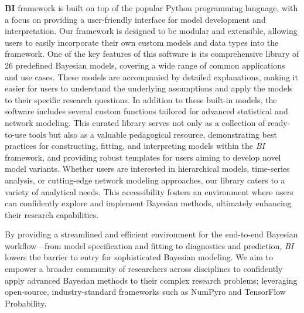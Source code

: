 \documentclass[blind,lineno,num-refs]{wiley-article}
\begin{document}
\textbf{BI} framework is built on top of the popular Python programming language, with a focus on providing a user-friendly interface for model development and interpretation. Our framework is designed to be modular and extensible, allowing users to easily incorporate their own custom models and data types into the framework. One of the key features of this software is its comprehensive library of 26 predefined Bayesian models, covering a wide range of common applications and use cases. These models are accompanied by detailed explanations, making it easier for users to understand the underlying assumptions and apply the models to their specific research questions. In addition to these built-in models, the software includes several custom functions tailored for advanced statistical and network modeling. This curated library serves not only as a collection of ready-to-use tools but also as a valuable pedagogical resource, demonstrating best practices for constructing, fitting, and interpreting models within the \textit{BI} framework, and providing robust templates for users aiming to develop novel model variants. Whether users are interested in hierarchical models, time-series analysis, or cutting-edge network modeling approaches, our library caters to a variety of analytical needs. This accessibility fosters an environment where users can confidently explore and implement Bayesian methods, ultimately enhancing their research capabilities.

By providing a streamlined and efficient environment for the end-to-end Bayesian workflow—from model specification and fitting to diagnostics and prediction, \textit{BI} lowers the barrier to entry for sophisticated Bayesian modeling. We aim to empower a broader community of researchers across disciplines to confidently apply advanced Bayesian methods to their complex research problems; leveraging open-source, industry-standard frameworks such as NumPyro and TensorFlow Probability.

\printendnotes


\end{document}
